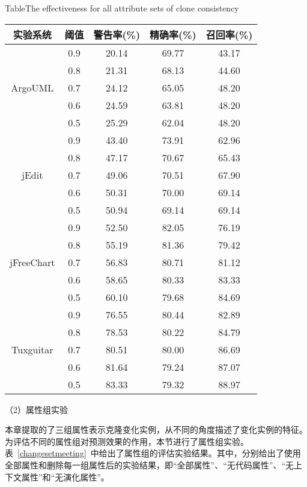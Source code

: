 \begin{table}[htbp]
{Table$\!$}{The effectiveness for all attribute sets of clone consistency}
\vspace{0.5em}
\centering
\wuhao
\begin{tabular}{ccccc}
\toprule[1.5pt]
{实验系统}&{阈值}&{警告率(\%)}&{精确率(\%)}&{召回率(\%)}\\
\midrule[1pt]
 \multirow{5}{*}{ArgoUML}
&0.9&	20.14&	69.77&	43.17\\
&0.8&	21.31&	68.13&	44.60\\
&0.7&	24.12&	65.05&	48.20\\
&0.6&	24.59&	63.81&	48.20\\
&0.5&	25.29&	62.04&	48.20\\
\hline
\multirow{5}{*}{jEdit}
&0.9&	43.40&	73.91&	62.96\\
&0.8&	47.17&	70.67&	65.43\\
&0.7&	49.06&	70.51&	67.90\\
&0.6&	50.31&	70.00&	69.14\\
&0.5&	50.94&	69.14&	69.14\\
\hline
\multirow{5}{*}{jFreeChart}
&0.9&	52.50&	82.05&	76.19\\
&0.8&	55.19&	81.36&	79.42\\
&0.7&	56.83&	80.71&	81.12\\
&0.6&	58.65&	80.33&	83.33\\
&0.5&	60.10&	79.68&	84.69\\
\hline
\multirow{5}{*}{Tuxguitar}
&0.9	&76.55&   80.44&	82.89\\
&0.8	&78.53&	80.22&	84.79\\
&0.7	&80.51&	80.00&	86.69\\
&0.6	&81.64&	79.24&	87.07\\
&0.5    &83.33&	79.32&	88.97\\
\bottomrule[1.5pt]
\end{tabular}
\end{table}


（2）属性组实验

本章提取的了三组属性表示克隆变化实例，从不同的角度描述了变化实例的特征。为评估不同的属性组对预测效果的作用，本节进行了属性组实验。表~\ref{changesetmeeting}~中给出了属性组的评估实验结果。其中，分别给出了使用全部属性和删除每一组属性后的实验结果，即“全部属性”、“无代码属性”、“无上下文属性”和“无演化属性”。

